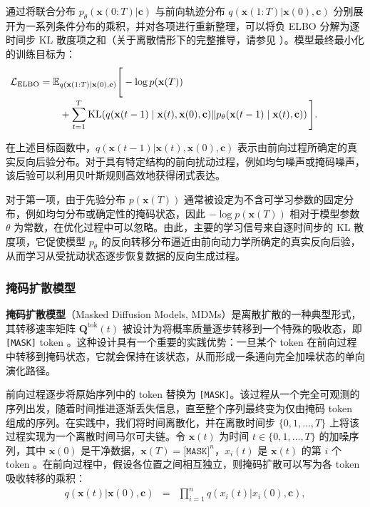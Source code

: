 \documentclass[UTF8,a4paper,zihao=-4,oneside,openany]{ctexbook}
\begin{document}
通过将联合分布 $p_\theta(\mathbf{x}(0{:}T) | \mathbf{c})$ 与前向轨迹分布 $q(\mathbf{x}(1{:}T) | \mathbf{x}(0), \mathbf{c})$ 分别展开为一系列条件分布的乘积，并对各项进行重新整理，可以将负 ELBO 分解为逐时间步 KL 散度项之和（关于离散情形下的完整推导，请参见 \citep{austin-etal:2021structured}）。模型最终最小化的训练目标为：
\begin{equation}
\hspace*{-1.5cm}
\begin{aligned}
\mathcal{L}_{\mathrm{ELBO}}
&=
\mathbb{E}_{q(\mathbf{x}(1{:}T)\mid\mathbf{x}(0),\mathbf{c})}
\Bigg[
-\log p(\mathbf{x}(T))
\\[-2pt]
&\qquad+
\sum_{t=1}^{T}
\mathrm{KL}\!\left(
q(\mathbf{x}(t-1)\mid\mathbf{x}(t),\mathbf{x}(0),\mathbf{c})
\middle\Vert
p_{\theta}(\mathbf{x}(t-1)\mid\mathbf{x}(t),\mathbf{c})
\right)
\Bigg].
\end{aligned}
\label{eq:discrete-elbo}
\end{equation}

\noindent
在上述目标函数中，$q(\mathbf{x}(t-1)| \mathbf{x}(t),\mathbf{x}(0),\mathbf{c})$ 表示由前向过程所确定的真实反向后验分布。对于具有特定结构的前向扰动过程，例如均匀噪声或掩码噪声，该后验可以利用贝叶斯规则高效地获得闭式表达。

对于第一项，由于先验分布 $p(\mathbf{x}(T))$ 通常被设定为不含可学习参数的固定分布，例如均匀分布或确定性的掩码状态，因此 $-\log p(\mathbf{x}(T))$ 相对于模型参数 $\theta$ 为常数，在优化过程中可以忽略。由此，主要的学习信号来自逐时间步的 KL 散度项，它促使模型 $p_\theta$ 的反向转移分布逼近由前向动力学所确定的真实反向后验，从而学习从受扰动状态逐步恢复数据的反向生成过程。

\subsubsection{掩码扩散模型}

\textbf{掩码扩散模型}（Masked Diffusion Models, MDMs）是离散扩散的一种典型形式，其转移速率矩阵 $\mathbf{Q}^{\mathrm{tok}}(t)$ 被设计为将概率质量逐步转移到一个特殊的吸收态，即 \texttt{[MASK]}  token \citep{sahoo-etal:2024simple,nie-etal:2025large}。这种设计具有一个重要的实践优势：一旦某个 token 在前向过程中转移到掩码状态，它就会保持在该状态，从而形成一条通向完全加噪状态的单向演化路径。

前向过程逐步将原始序列中的 token 替换为 \texttt{[MASK]}。该过程从一个完全可观测的序列出发，随着时间推进逐渐丢失信息，直至整个序列最终变为仅由掩码 token 组成的序列。在实践中，我们将时间离散化，并在离散时间步 $\{0,1,\dots,T\}$ 上将该过程实现为一个离散时间马尔可夫链。令 $\mathbf{x}(t)$ 为时间 $t \in \{0,1,\dots,T\}$ 的加噪序列，其中 $\mathbf{x}(0)$ 是干净数据，$\mathbf{x}(T) = \texttt{[MASK]}^n$，$x_i(t)$ 是 $\mathbf{x}(t)$ 的第 $i$ 个 token 。在前向过程中，假设各位置之间相互独立，则掩码扩散可以写为各 token 吸收转移的乘积：
\begin{eqnarray}
q(\mathbf{x}(t) | \mathbf{x}(0), \mathbf{c}) & = & \prod_{i=1}^n q(x_i(t) | x_i(0), \mathbf{c}), \label{eq:mdm-forward-factorize}
\end{eqnarray}
\end{document}
